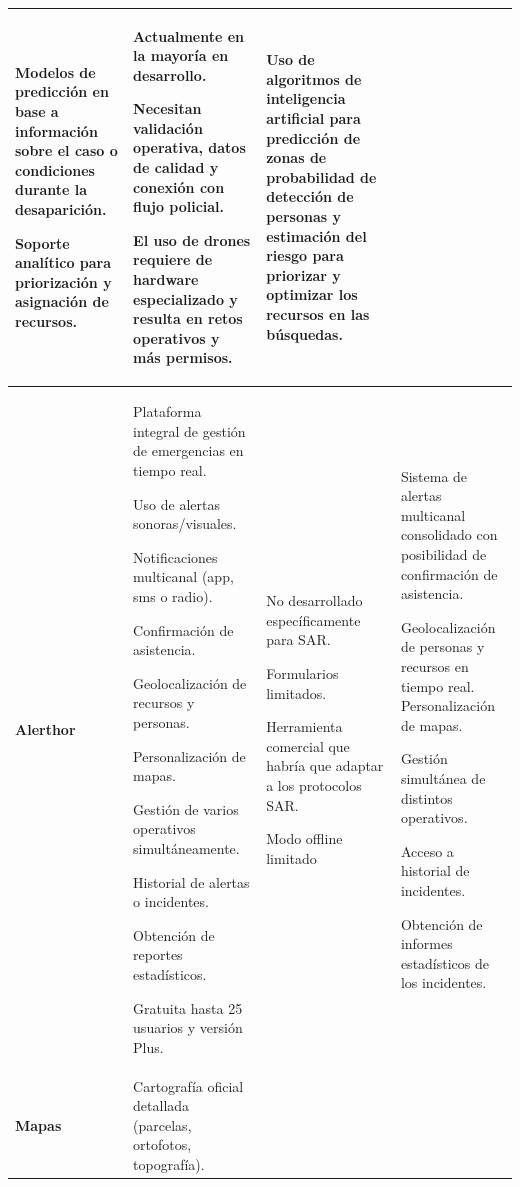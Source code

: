 \begin{table}[htbp]
\begin{tabular}{ |m{2cm}|m{5cm}|m{4cm}|m{3cm}|  }
{    Modelos de predicción en base a información sobre el caso o condiciones durante la desaparición. 
    
    Soporte analítico para priorización y asignación de recursos.
    } 
    & {Actualmente en la mayoría en desarrollo.

    Necesitan validación operativa, datos de calidad y conexión con flujo policial.
    
    El uso de drones requiere de hardware especializado y resulta en retos operativos y más permisos. 
    } 
    & {Uso de algoritmos de inteligencia artificial para predicción de zonas de probabilidad de detección de personas y estimación del riesgo para priorizar y optimizar los recursos en las búsquedas.}\\
\hline
\cellcolor[HTML]{EFEFEF}\textbf{Alerthor} 
    & {Plataforma integral de gestión de emergencias en tiempo real.
    
    Uso de alertas sonoras/visuales.
    
    Notificaciones multicanal (app, sms o radio).
    
    Confirmación de asistencia.
    
    Geolocalización de recursos y personas.
    
    Personalización de mapas.
    
    Gestión de varios operativos simultáneamente.
    
    Historial de alertas o incidentes.
    
    Obtención de reportes estadísticos.
    
    Gratuita hasta 25 usuarios y versión Plus.
    } 
    & {No desarrollado específicamente para SAR.
    
    Formularios limitados.
    
    Herramienta comercial que habría que adaptar a los protocolos SAR.
    
    Modo offline limitado 
    } 
    & {Sistema de alertas multicanal consolidado con posibilidad de confirmación de asistencia.
    
    Geolocalización de personas y recursos en tiempo real.
    Personalización de mapas.
    
    Gestión simultánea de distintos operativos.
    
    Acceso a historial de incidentes.
    
    Obtención de informes estadísticos de los incidentes.
    }\\
\hline
\cellcolor[HTML]{EFEFEF}\textbf{Mapas} 
    & {Cartografía oficial detallada (parcelas, ortofotos, topografía).
    
}
\end{tabular}
\end{table}
